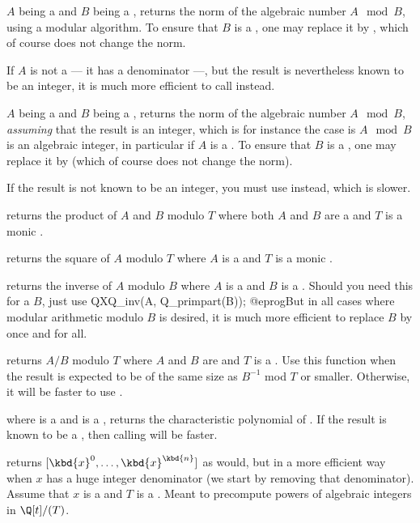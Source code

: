
 $A$ being a  and $B$ being a
, returns the norm of the algebraic number $A \mod B$, using a
modular algorithm. To ensure that $B$ is a , one may replace it by
, which of course does not change the norm.

If $A$ is not a  --- it has a denominator ---, but the result is
nevertheless known to be an integer, it is much more efficient to call
 instead.

 $A$ being a  and $B$
being a , returns the norm of the algebraic number $A \mod B$,
\emph{assuming} that the result is an integer, which is for instance the case
is $A\mod B$ is an algebraic integer, in particular if $A$ is a . To
ensure that $B$ is a , one may replace it by 
(which of course does not change the norm).

If the result is not known to be an integer, you must use 
instead, which is slower.

 returns the product of $A$ and $B$
modulo $T$ where both $A$ and $B$ are a  and $T$ is a monic .

 returns the square of $A$
modulo $T$ where $A$ is a  and $T$ is a monic .

 returns the inverse of $A$ modulo $B$
where $A$ is a  and $B$ is a . Should you need this for
a  $B$, just use
\bprog
  QXQ_inv(A, Q_primpart(B));
@eprog\noindent But in all cases where modular arithmetic modulo $B$ is
desired, it is much more efficient to replace $B$ by 
once and for all.

 returns $A/B$ modulo $T$
where $A$ and $B$ are  and $T$ is a . Use this function
when the result is expected to be of the same size as $B^{-1}$ mod $T$
or smaller.
Otherwise, it will be faster to use .

 where  is a  and
 is a , returns the characteristic polynomial of .
If the result is known to be a , then calling  will
be faster.

 returns $[\kbd{x}^0, \dots,
\kbd{x}^\kbd{n}]$ as  would, but in a more efficient way when
$x$ has a huge integer denominator (we start by removing that denominator).
Assume that $x$ is a  and $T$ is a . Meant to precompute
powers of algebraic integers in $\Q[t]/(T)$.

